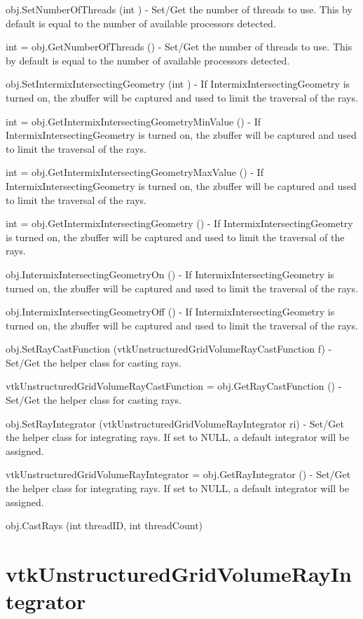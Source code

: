 \begin{DoxyItemize}
\item {\ttfamily obj.\-Set\-Number\-Of\-Threads (int )} -\/ Set/\-Get the number of threads to use. This by default is equal to the number of available processors detected.  
\item {\ttfamily int = obj.\-Get\-Number\-Of\-Threads ()} -\/ Set/\-Get the number of threads to use. This by default is equal to the number of available processors detected.  
\item {\ttfamily obj.\-Set\-Intermix\-Intersecting\-Geometry (int )} -\/ If Intermix\-Intersecting\-Geometry is turned on, the zbuffer will be captured and used to limit the traversal of the rays.  
\item {\ttfamily int = obj.\-Get\-Intermix\-Intersecting\-Geometry\-Min\-Value ()} -\/ If Intermix\-Intersecting\-Geometry is turned on, the zbuffer will be captured and used to limit the traversal of the rays.  
\item {\ttfamily int = obj.\-Get\-Intermix\-Intersecting\-Geometry\-Max\-Value ()} -\/ If Intermix\-Intersecting\-Geometry is turned on, the zbuffer will be captured and used to limit the traversal of the rays.  
\item {\ttfamily int = obj.\-Get\-Intermix\-Intersecting\-Geometry ()} -\/ If Intermix\-Intersecting\-Geometry is turned on, the zbuffer will be captured and used to limit the traversal of the rays.  
\item {\ttfamily obj.\-Intermix\-Intersecting\-Geometry\-On ()} -\/ If Intermix\-Intersecting\-Geometry is turned on, the zbuffer will be captured and used to limit the traversal of the rays.  
\item {\ttfamily obj.\-Intermix\-Intersecting\-Geometry\-Off ()} -\/ If Intermix\-Intersecting\-Geometry is turned on, the zbuffer will be captured and used to limit the traversal of the rays.  
\item {\ttfamily obj.\-Set\-Ray\-Cast\-Function (vtk\-Unstructured\-Grid\-Volume\-Ray\-Cast\-Function f)} -\/ Set/\-Get the helper class for casting rays.  
\item {\ttfamily vtk\-Unstructured\-Grid\-Volume\-Ray\-Cast\-Function = obj.\-Get\-Ray\-Cast\-Function ()} -\/ Set/\-Get the helper class for casting rays.  
\item {\ttfamily obj.\-Set\-Ray\-Integrator (vtk\-Unstructured\-Grid\-Volume\-Ray\-Integrator ri)} -\/ Set/\-Get the helper class for integrating rays. If set to N\-U\-L\-L, a default integrator will be assigned.  
\item {\ttfamily vtk\-Unstructured\-Grid\-Volume\-Ray\-Integrator = obj.\-Get\-Ray\-Integrator ()} -\/ Set/\-Get the helper class for integrating rays. If set to N\-U\-L\-L, a default integrator will be assigned.  
\item {\ttfamily obj.\-Cast\-Rays (int thread\-I\-D, int thread\-Count)}  
\end{DoxyItemize}\hypertarget{vtkvolumerendering_vtkunstructuredgridvolumerayintegrator}{}\section{vtk\-Unstructured\-Grid\-Volume\-Ray\-Integrator}\label{vtkvolumerendering_vtkunstructuredgridvolumerayintegrator}
